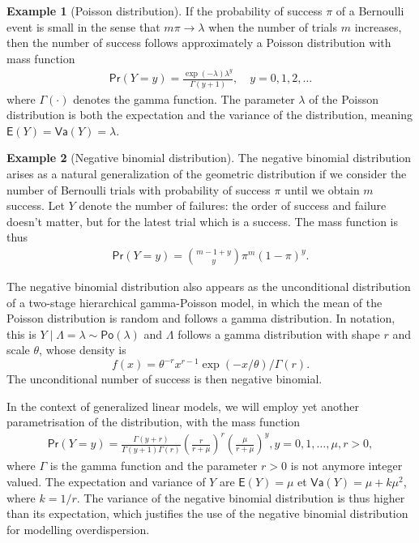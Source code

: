 \documentclass[
  11pt,
  letterpaper,
]{book}
\theoremstyle{definition}
\theoremstyle{definition}
\newtheorem{example}{Example}[chapter]
\theoremstyle{definition}
\theoremstyle{remark}
\begin{document}
\begin{example}[Poisson distribution]
\protect\hypertarget{exm:poissondist}{}{\label{exm:poissondist} {} }If the probability of success \(\pi\) of a Bernoulli event is small in the sense that \(m\pi \to \lambda\) when the number of trials \(m\) increases, then the number of success follows approximately a Poisson distribution with mass function
\begin{align*}
\mathsf{Pr}(Y=y) = \frac{\exp(-\lambda)\lambda^y}{\Gamma(y+1)}, \quad y=0, 1, 2, \ldots
\end{align*}
where \(\Gamma(\cdot)\) denotes the gamma function. The parameter \(\lambda\) of the Poisson distribution is both the expectation and the variance of the distribution, meaning \(\mathsf{E}(Y)=\mathsf{Va}(Y)=\lambda\).
\end{example}

\begin{example}[Negative binomial distribution]
\protect\hypertarget{exm:negbindist}{}{\label{exm:negbindist} {} }The negative binomial distribution arises as a natural generalization of the geometric distribution if we consider the number of Bernoulli trials with probability of success \(\pi\) until we obtain \(m\) success. Let \(Y\) denote the number of failures: the order of success and failure doesn't matter, but for the latest trial which is a success. The mass function is thus
\begin{align*}
\mathsf{Pr}(Y=y)= \binom{m-1+y}{y} \pi^m (1-\pi)^{y}.
\end{align*}

The negative binomial distribution also appears as the unconditional distribution of a two-stage hierarchical gamma-Poisson model, in which the mean of the Poisson distribution is random and follows a gamma distribution. In notation, this is \(Y \mid \Lambda=\lambda \sim \mathsf{Po}(\lambda)\) and \(\Lambda\) follows a gamma distribution with shape \(r\) and scale \(\theta\), whose density is \[f(x) = \theta^{-r}x^{r-1}\exp(-x/\theta)/\Gamma(r).\] The unconditional number of success is then negative binomial.

In the context of generalized linear models, we will employ yet another parametrisation of the distribution, with the mass function
\begin{align*}
\mathsf{Pr}(Y=y)=\frac{\Gamma(y+r)}{\Gamma(y+1)\Gamma(r)} \left(\frac{r}{r + \mu} \right)^{r} \left(\frac{\mu}{r+\mu}\right)^y, y=0, 1, \ldots, \mu,r >0,
\end{align*}
where \(\Gamma\) is the gamma function and the parameter \(r>0\) is not anymore integer valued. The expectation and variance of \(Y\) are
\(\mathsf{E}(Y)=\mu\) et \(\mathsf{Va}(Y)=\mu+k\mu^2\), where \(k=1/r\). The variance of the negative binomial distribution is thus higher than its expectation, which justifies the use of the negative binomial distribution for modelling overdispersion.
\end{example}
\end{document}
